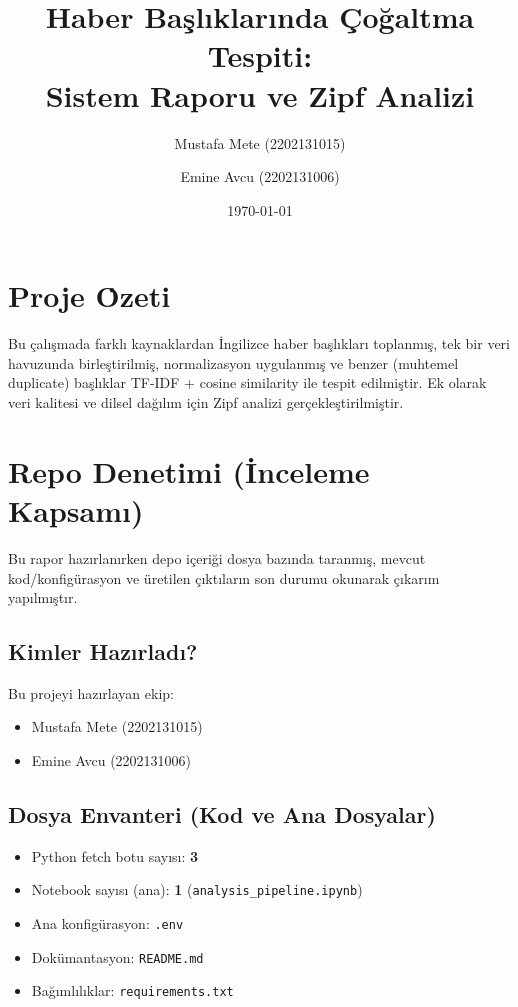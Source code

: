 \documentclass[12pt,a4paper]{article}
\title{Haber Ba\c{s}l\i{}klar\i{}nda \c{C}o\u{g}altma Tespiti:\\
Sistem Raporu ve Zipf Analizi}
\author{Mustafa Mete (2202131015) \and Emine Avcu (2202131006)}
\date{\today}
\begin{document}
\maketitle

\section{Proje \.Ozeti}
Bu \c{c}al\i{}\c{s}mada farkl\i{} kaynaklardan \.{I}ngilizce haber ba\c{s}l\i{}klar\i{} toplanm\i{}\c{s}, tek bir veri havuzunda birle\c{s}tirilmi\c{s}, normalizasyon uygulanm\i{}\c{s} ve benzer (muhtemel duplicate) ba\c{s}l\i{}klar TF-IDF + cosine similarity ile tespit edilmi\c{s}tir. Ek olarak veri kalitesi ve dilsel da\u{g}\i{}l\i{}m i\c{c}in Zipf analizi ger\c{c}ekle\c{s}tirilmi\c{s}tir.

\section{Repo Denetimi (\.Inceleme Kapsam\i{})}
Bu rapor haz\i{}rlan\i{}rken depo i\c{c}eri\u{g}i dosya baz\i{}nda taranm\i{}\c{s}, mevcut kod/konfig\"urasyon ve \"uretilen \c{c}\i{}kt\i{}lar\i{}n son durumu okunarak \c{c}\i{}kar\i{}m yap\i{}lm\i{}\c{s}t\i{}r.

\subsection{Kimler Haz\i{}rlad\i{}?}
Bu projeyi haz\i{}rlayan ekip:
\begin{itemize}
    \item Mustafa Mete (2202131015)
    \item Emine Avcu (2202131006)
\end{itemize}

\subsection{Dosya Envanteri (Kod ve Ana Dosyalar)}
\begin{itemize}
    \item Python fetch botu say\i{}s\i{}: \textbf{3}
    \item Notebook say\i{}s\i{} (ana): \textbf{1} (\texttt{analysis\_pipeline.ipynb})
    \item Ana konfig\"urasyon: \texttt{.env}
    \item Dok\"umantasyon: \texttt{README.md}
    \item Ba\u{g}\i{}ml\i{}l\i{}klar: \texttt{requirements.txt}
\end{itemize}
\end{document}
